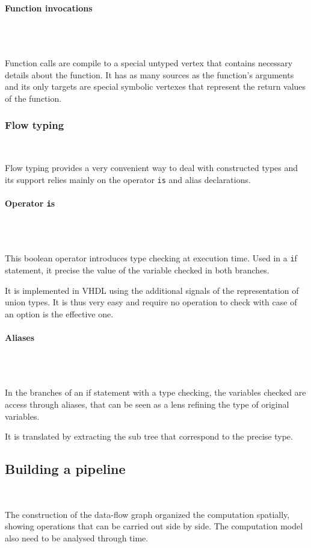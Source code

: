 \documentclass[10pt,a4paper]{article}
\newcommand{\code}{\texttt}
\renewcommand{\indent}{~\\\vspace{-.8cm}}
\newcommand{\pindent}{~\\\indent}
\begin{document}
\paragraph{Function invocations}\pindent

Function calls are compile to a special untyped vertex that contains necessary details about the function. It has as many sources as the function's arguments and its only targets are special symbolic vertexes that represent the return values of the function.


\subsubsection{Flow typing}
\label{FlowT}\indent

Flow typing provides a very convenient way to deal with constructed types and its support relies mainly on the operator \code {is} and alias declarations.


\paragraph{Operator \code is}~\\\indent

This boolean operator introduces type checking at execution time. Used in a \code if statement, it precise the value of the variable checked in both branches.

It is implemented in VHDL using the additional signals of the representation of union types. It is thus very easy and require no operation to check with case of an option is the effective one.

\paragraph{Aliases}~\\\indent

In the branches of an if statement with a type checking, the variables checked are access through aliases, that can be seen as a lens refining the type of original variables. 

It is translated by extracting the sub tree that correspond to the precise type.


\subsection{Building a pipeline}
\label{Opts}
\indent

The construction of the data-flow graph organized the computation spatially, showing operations that can be carried out side by side. The computation model also need to be analysed through time.
\end{document}
